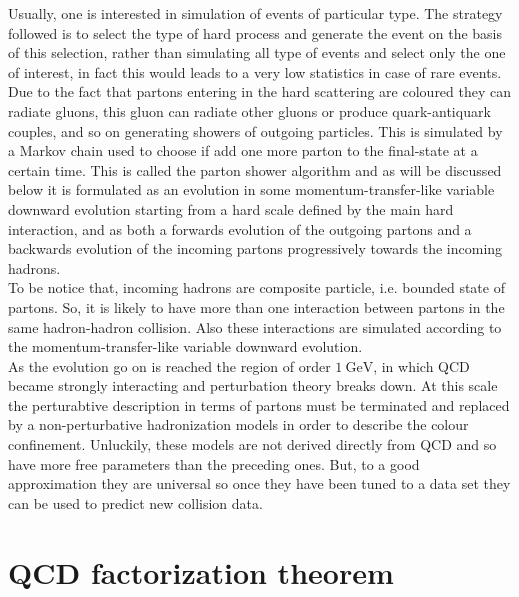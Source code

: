 Usually, one is interested in simulation of events of particular type. The strategy followed is to select the type of hard process and generate the event on the basis of this selection, rather than simulating all type of events and select only the one of interest, in fact this would leads to a very low statistics in case of rare events. Due to the fact that partons entering in the hard scattering are coloured they can radiate gluons, this gluon can radiate other gluons or produce quark-antiquark couples, and so on generating showers of outgoing particles. This is simulated by a Markov chain used to choose if add one more parton to the final-state at a certain time. This is called the parton shower algorithm and as will be discussed below it is formulated as an evolution in some momentum-transfer-like variable downward evolution starting from a hard scale defined by the main hard interaction, and as both a forwards evolution of the outgoing 
partons and a backwards evolution of the incoming partons progressively towards the incoming hadrons.
\\
To be notice that, incoming hadrons are composite particle, i.e. bounded state of partons. So, it is likely to have more than one interaction between partons in the same hadron-hadron collision. Also these interactions are simulated according to the momentum-transfer-like variable downward evolution. 
\\
As the evolution go on is reached the region of order $1\ \mathrm{GeV}$, in which QCD became strongly interacting and perturbation theory breaks down. At this scale the perturabtive description in terms of partons must be terminated and replaced by a non-perturbative hadronization models in order to describe the colour confinement. Unluckily, these models are not derived directly from QCD and so have more free parameters than the preceding ones. But, to a good approximation they are universal so once they have been tuned to a data set they can be used to predict new collision data. 









\section{QCD factorization theorem}

